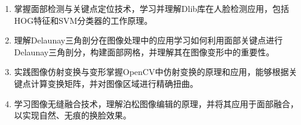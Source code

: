 
\begin{enumerate}
    \item 掌握面部检测与关键点定位技术，学习并理解Dlib库在人脸检测应用，包括HOG特征和SVM分类器的工作原理。
    \item 理解Delaunay三角剖分在图像处理中的应用学习如何利用面部关键点进行Delaunay三角剖分，构建面部网格，并理解其在图像变形中的重要性。
    \item 实践图像仿射变换与变形掌握OpenCV中仿射变换的原理和应用，能够根据关键点计算变换矩阵，并对图像区域进行精确扭曲。
    \item 学习图像无缝融合技术，理解泊松图像编辑的原理，并将其应用于面部融合，以实现自然、无痕的换脸效果。
\end{enumerate}
